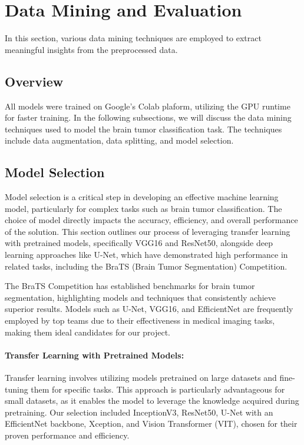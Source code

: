 \section{Data Mining and Evaluation}\label{data_mining}

In this section, various data mining techniques are employed to extract meaningful insights from the preprocessed data.

\subsection{Overview}\label{overview}

All models were trained on Google's Colab plaform, utilizing the GPU runtime for faster training. In the following subsections, we will discuss the data mining techniques used to model the brain tumor classification task. The techniques include data augmentation, data splitting, and model selection.

\subsection{Model Selection}\label{model_selection}

Model selection is a critical step in developing an effective machine learning model, particularly for complex tasks such as brain tumor classification. The choice of model directly impacts the accuracy, efficiency, and overall performance of the solution. This section outlines our process of leveraging transfer learning with pretrained models, specifically VGG16 and ResNet50, alongside deep learning approaches like U-Net, which have demonstrated high performance in related tasks, including the BraTS (Brain Tumor Segmentation) Competition.

The BraTS Competition has established benchmarks for brain tumor segmentation, highlighting models and techniques that consistently achieve superior results. Models such as U-Net, VGG16, and EfficientNet are frequently employed by top teams due to their effectiveness in medical imaging tasks, making them ideal candidates for our project.

\paragraph{Transfer Learning with Pretrained Models:}
Transfer learning involves utilizing models pretrained on large datasets and fine-tuning them for specific tasks. This approach is particularly advantageous for small datasets, as it enables the model to leverage the knowledge acquired during pretraining. Our selection included InceptionV3, ResNet50, U-Net with an EfficientNet backbone, Xception, and Vision Transformer (VIT), chosen for their proven performance and efficiency.

